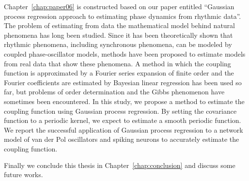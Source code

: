 Chapter~\ref{chap:paper06} is constructed based on our paper \cite{yoneda2022} entitled ``Gaussian process regression approach to estimating phase dynamics from rhythmic data''.
The problem of estimating from data the mathematical model behind natural phenomena has long been studied. Since it has been theoretically shown that rhythmic phenomena, including synchronous phenomena, can be modeled by coupled phase-oscillator models, methods have been proposed to estimate models from real data that show these phenomena. A method in which the coupling function is approximated by a Fourier series expansion of finite order and the Fourier coefficients are estimated by Bayesian linear regression has been used so far, but problems of order determination and the Gibbs phenomenon have sometimes been encountered. In this study, we propose a method to estimate the coupling function using Gaussian process regression. By setting the covariance function to a periodic kernel, we expect to estimate a smooth periodic function. We report the successful application of Gaussian process regression to a network model of van der Pol oscillators and spiking neurons to accurately estimate the coupling function.

Finally we conclude this thesis in Chapter~\ref{chap:conclusion} and discuss some future works.
